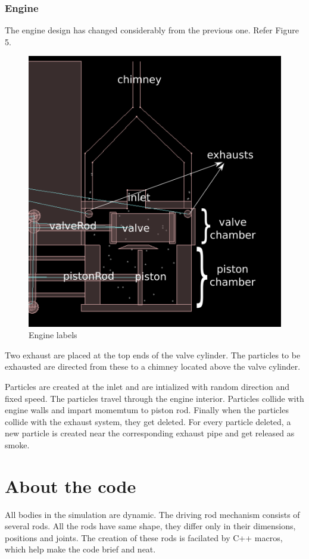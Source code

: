 \documentclass[pdftex,12pt,a4paper]{article}
\begin{document}
\subsubsection{Engine}
\par{The engine design\cite{youtube2} has changed considerably from the previous one. Refer Figure 5.}
\begin{figure}[H]
\centering
\includegraphics[scale=.37]{../images/enginelabels.png}
\caption{Engine labels}
\end{figure}
\par{Two exhaust are placed at the top ends of the valve cylinder. The particles to be exhausted are directed from these to a chimney located above the valve cylinder.}
\par{Particles are created at the inlet and are intialized with random direction and fixed speed. The particles travel through the engine interior. Particles collide with engine walls and impart momemtum to piston rod. Finally when the particles collide with the exhaust system, they get deleted. For every particle deleted, a new particle is created near the corresponding exhaust pipe and get released as smoke.}

\section{About the code}
\par{All bodies in the simulation are dynamic. The driving rod mechanism consists of several rods. All the rods have same shape, they differ only in their dimensions, positions and joints. The creation of these rods is facilated by C++ macros, which help make the code brief and neat.}
\end{document}

